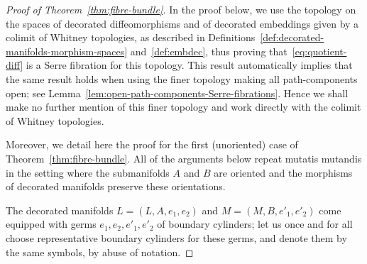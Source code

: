 \documentclass[AHL,Unicode,published]{cedram}
\begin{document}
\begin{proof}[Proof of Theorem~\ref{thm:fibre-bundle}]
In the proof below, we use the topology on the spaces of decorated diffeomorphisms and of decorated embeddings given by a colimit of Whitney topologies, as described in Definitions~\ref{def:decorated-manifolds-morphism-spaces} and~\ref{def:embdec}, thus proving that~\eqref{eq:quotient-diff} is a Serre fibration for this topology. This result automatically implies that the same result holds when using the finer topology making all path-components open; see Lemma~\ref{lem:open-path-components-Serre-fibrations}. Hence we shall make no further mention of this finer topology and work directly with the colimit of Whitney topologies.

Moreover, we detail here the proof for the first (unoriented) case of Theorem~\ref{thm:fibre-bundle}. All of the arguments below repeat mutatis mutandis in the setting where the submanifolds $A$ and $B$ are oriented and the morphisms of decorated manifolds preserve these orientations.

The decorated manifolds $L = (L,A,e_{1},e_{2})$ and $M = (M,B,e'_{1},e'_{2})$ come equipped with germs $e_{1},e_{2},e'_{1},e'_{2}$ of boundary cylinders; let us once and for all choose representative boundary cylinders for these germs, and denote them by the same symbols, by abuse of notation.


\end{proof}
\end{document}
